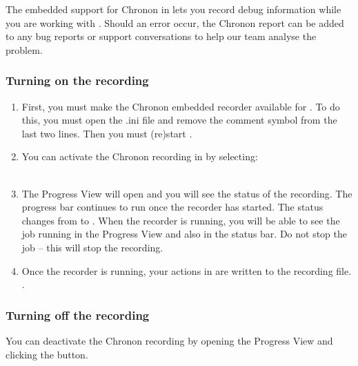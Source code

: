 The embedded support for Chronon in \app{} lets you record debug information while you are working with \app{}. Should an error occur, the Chronon report can be added to any bug reports or support conversations to help our team analyse the problem. 

\subsubsection{Turning on the recording}
\begin{enumerate}
\item First, you must make the Chronon embedded recorder available for \app{}. To do this, you must open the \app{}.ini file and remove the comment symbol from the last two lines. Then you must (re)start \app{}. 
\item You can activate the Chronon recording in \app{} by selecting:\\
\\
\item The Progress View will open and you will see the status of the recording. The progress bar continues to run once the recorder has started. The status changes from  to . When the recorder is running, you will be able to see the job running in the Progress View and also in the status bar. Do not stop the job -- this will stop the recording. 
\item Once the recorder is running, your actions in \app{} are written to the recording file.
. 
\end{enumerate}

 
\subsubsection{Turning off the recording}
You can deactivate the Chronon recording by opening the Progress View and clicking the  button. 

